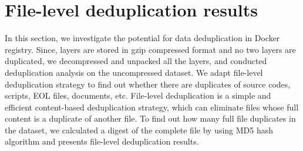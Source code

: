 \section{File-level deduplication results}
\label{sec:redundant_files}



In this section, we
investigate the potential for data deduplication in Docker registry. 
Since, layers are stored in gzip compressed format and no two layers are
duplicated, we decompressed and unpacked all the layers, and conducted
deduplication analysis on the uncompressed dataset. 
We adapt file-level deduplication strategy to find out whether
there are duplicates of source codes, scripts, EOL files, documents, etc.
File-level deduplication is a simple and efficient content-based deduplication
strategy, which can eliminate files whose full content is a duplicate of
another file. To find out how many full file duplicates in the dataset, we
calculated a digest of the complete file by using MD5 hash algorithm and
presents file-level deduplication results.



